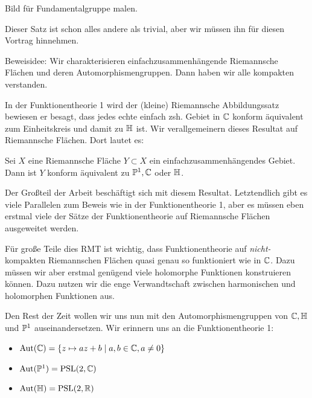 Bild für Fundamentalgruppe malen.

Dieser Satz ist schon alles andere als trivial, aber wir müssen ihn
für diesen Vortrag hinnehmen.

Beweisidee: Wir charakterisieren einfachzusammenhängende Riemannsche
Flächen und deren Automorphismengruppen. Dann haben wir alle kompakten
verstanden.

In der Funktionentheorie 1 wird der (kleine) Riemannsche
Abbildungssatz bewiesen er besagt, dass jedes echte einfach zsh. Gebiet in $\C$
konform äquivalent zum Einheitskreis und damit zu $\h$ ist. Wir
verallgemeinern dieses Resultat auf Riemannsche Flächen. Dort lautet
es:

\begin{thm}
  Sei $X$ eine Riemannsche Fläche $Y \subset X$ ein
  einfachzusammenhängendes Gebiet. Dann ist $Y$ konform äquivalent zu
  $\P^1, \C$ oder $\h$.
\end{thm}

Der Großteil der Arbeit beschäftigt sich mit diesem
Resultat. Letztendlich gibt es viele Parallelen zum Beweis wie in der
Funktionentheorie 1, aber es müssen eben erstmal viele der Sätze der
Funktionentheorie auf Riemannsche Flächen ausgeweitet werden.



Für große Teile dies RMT ist wichtig, dass Funktionentheorie auf
\emph{nicht-}kompakten Riemannschen Flächen quasi genau so
funktioniert wie in $\C$. Dazu müssen wir aber erstmal genügend viele
holomorphe Funktionen konstruieren können. Dazu nutzen wir die enge
Verwandtschaft zwischen harmonischen und holomorphen Funktionen aus.

Den Rest der Zeit wollen wir uns nun mit den Automorphismengruppen von
$\C, \h$ und $\P^1$ auseinandersetzen. Wir erinnern uns an die
Funktionentheorie 1:

\begin{thm}
  \begin{itemize}
  \item $\Aut(\C) = \{z \mapsto az +b \mid a,b \in \C, a \neq 0 \}$
  \item $\Aut(\P^1) = \PSL(2,\C)$
  \item $\Aut(\h) = \PSL(2, \R)$
  \end{itemize}
\end{thm}


